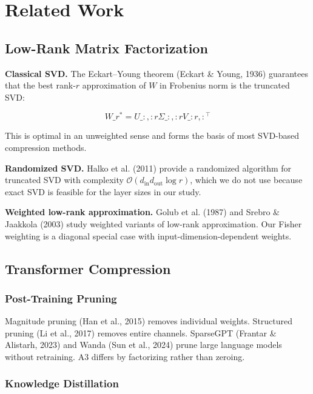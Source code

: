 
\section{Related Work}

\subsection{Low-Rank Matrix Factorization}

\textbf{Classical SVD.} The Eckart--Young theorem (Eckart \& Young, 1936) guarantees 
that the best rank-$r$ approximation of $W$ in Frobenius norm is the truncated 
SVD:

\[
W\_r^* = U\_{:, :r} \Sigma\_{:, :r} V\_{:r, :}^\top
\tag{2.1}
\]

This is optimal in an unweighted sense and forms the basis of most 
SVD-based compression methods.

\textbf{Randomized SVD.} Halko et al. (2011) provide a randomized algorithm for 
truncated SVD with complexity $\mathcal{O}(d_\text{in} d_\text{out} \log r)$, 
which we do not use because exact SVD is feasible for the layer sizes in our 
study.

\textbf{Weighted low-rank approximation.} Golub et al. (1987) and Srebro \& Jaakkola 
(2003) study weighted variants of low-rank approximation. Our Fisher weighting 
is a diagonal special case with input-dimension-dependent weights.

\subsection{Transformer Compression}

\subsubsection{Post-Training Pruning}

Magnitude pruning (Han et al., 2015) removes individual weights. Structured 
pruning (Li et al., 2017) removes entire channels. SparseGPT (Frantar \& 
Alistarh, 2023) and Wanda (Sun et al., 2024) prune large language models 
without retraining. A3 differs by factorizing rather than zeroing.

\subsubsection{Knowledge Distillation}

